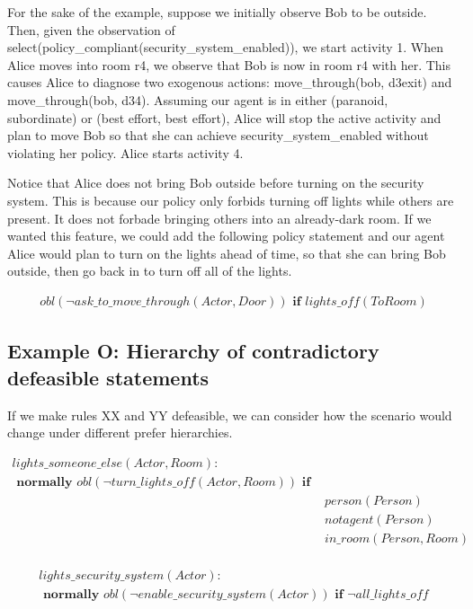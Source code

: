 For the sake of the example, suppose we initially observe Bob to be outside.
Then, given the observation of select(policy\_compliant(security\_system\_enabled)), we start activity 1.
When Alice moves into room r4, we observe that Bob is now in room r4 with her.
This causes Alice to diagnose two exogenous actions: move\_through(bob, d3exit) and move\_through(bob, d34).
Assuming our agent is in either (paranoid, subordinate) or (best effort, best effort), Alice will stop the active activity and plan to move Bob so that she can achieve security\_system\_enabled without violating her policy.
Alice starts activity 4.

Notice that Alice does not bring Bob outside before turning on the security system.
This is because our policy only forbids turning off lights while others are present.
It does not forbade bringing others into an already-dark room.
If we wanted this feature, we could add the following policy statement and our agent Alice would plan to turn on the lights ahead of time, so that she can bring Bob outside, then go back in to turn off all of the lights.

\begin{equation}
\begin{split}
obl(\neg ask\_to\_move\_through(Actor, Door)) \textbf{ if }
    lights\_off(ToRoom)
\end{split}
\end{equation}

\subsection{Example O: Hierarchy of contradictory defeasible statements}

If we make rules XX and YY defeasible, we can consider how the scenario would change under different prefer hierarchies.

\begin{equation}
\begin{split}
lights\_someone\_else(Actor, Room): \\
\textbf{ normally } obl(\neg turn\_lights\_off(Actor, Room)) \textbf{ if } \\
    & person(Person) \\
    & not agent(Person) \\
    & in\_room(Person, Room) \\
\end{split}
\end{equation}

\begin{equation}
\begin{split}
lights\_security\_system(Actor): \\
\textbf{ normally } obl(\neg enable\_security\_system(Actor)) \textbf{ if }
    \neg all\_lights\_off
\end{split}
\end{equation}


